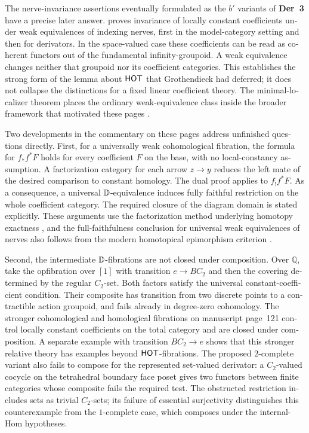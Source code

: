 \begin{otherlanguage}{english}
\begin{otherlanguage}{english}
The nerve-invariance assertions eventually formulated as the $b'$ variants of \textbf{Der~3} have a precise later answer. \citet[Theorem~1.3 and Corollary~3.8]{Cisinski2009LocallyConstant} proves invariance of locally constant coefficients under weak equivalences of indexing nerves, first in the model-category setting and then for derivators. In the space-valued case these coefficients can be read as coherent functors out of the fundamental infinity-groupoid. A weak equivalence changes neither that groupoid nor its coefficient categories. This establishes the strong form of the lemma about $\mathsf{HOT}$ that Grothendieck had deferred; it does not collapse the distinctions for a fixed linear coefficient theory. The minimal-localizer theorem places the ordinary weak-equivalence class inside the broader framework that motivated these pages \citep[Theorem~2.2.11]{Cisinski2004Minimal}.

Two developments in the commentary on these pages address unfinished questions directly. First, for a universally weak cohomological fibration, the formula for $f_*f^*F$ holds for every coefficient $F$ on the base, with no local-constancy assumption. A factorization category for each arrow $z\to y$ reduces the left mate of the desired comparison to constant homology. The dual proof applies to $f_!f^*F$. As a consequence, a universal $\mathbb{D}$-equivalence induces fully faithful restriction on the whole coefficient category. The required closure of the diagram domain is stated explicitly. These arguments use the factorization method underlying homotopy exactness \citep[Theorem~3.8]{GrothPontoShulman2014}, and the full-faithfulness conclusion for universal weak equivalences of nerves also follows from the modern homotopical epimorphism criterion \citep[Theorem~6.10]{GrothStovicek2016Trees}.

Second, the intermediate $\mathbb{D}$-fibrations are not closed under composition. Over $\mathbb Q$, take the opfibration over $[1]$ with transition $e\to BC_2$ and then the covering determined by the regular $C_2$-set. Both factors satisfy the universal constant-coefficient condition. Their composite has transition from two discrete points to a contractible action groupoid, and fails already in degree-zero cohomology. The stronger cohomological and homological fibrations on manuscript page~121 control locally constant coefficients on the total category and are closed under composition. A separate example with transition $BC_2\to e$ shows that this stronger relative theory has examples beyond $\mathsf{HOT}$-fibrations. The proposed $2$-complete variant also fails to compose for the represented set-valued derivator: a $C_2$-valued cocycle on the tetrahedral boundary face poset gives two functors between finite categories whose composite fails the required test. The obstructed restriction includes sets as trivial $C_2$-sets; its failure of essential surjectivity distinguishes this counterexample from the $1$-complete case, which composes under the internal-Hom hypotheses.


\end{otherlanguage}
\end{otherlanguage}
